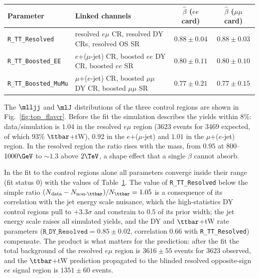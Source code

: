 \begin{table}[htbp]
  \centering
  \label{tab:top_rateparams}
  \small
  \begin{tabular}{llcc}
    \hline
    Parameter & Linked channels & $\hat\beta$ ($ee$ card) & $\hat\beta$ ($\mu\mu$ card) \\
    \hline
    \texttt{R\_TT\_Resolved} & resolved $e\mu$ CR, resolved DY CRs, resolved OS SR & $0.88 \pm 0.04$ & $0.88 \pm 0.03$ \\
    \texttt{R\_TT\_Boosted\_EE} & $e$+($\mu$-jet) CR, boosted $ee$ DY CR, boosted $ee$ SR & $0.80 \pm 0.11$ & $0.80 \pm 0.10$ \\
    \texttt{R\_TT\_Boosted\_MuMu} & $\mu$+($e$-jet) CR, boosted $\mu\mu$ DY CR, boosted $\mu\mu$ SR & $0.77 \pm 0.21$ & $0.77 \pm 0.15$ \\
    \hline
  \end{tabular}
\end{table}

The $\mlljj$ and $\mlJ$ distributions of the three control regions are shown in
Fig.~\ref{fig:top_flavcr}. Before the fit the simulation describes the yields
within $8\%$: data/simulation is $1.04$ in the resolved $e\mu$ region
($3623$ events for $3469$ expected, of which $93\%$ $\ttbar$+tW), $0.92$ in the
$e$+($\mu$-jet) and $1.01$ in the $\mu$+($e$-jet) region. In the resolved region
the ratio rises with the mass, from $0.95$ at $800$--$1000\GeV$ to ${\sim}1.3$
above $2\TeV$, a shape effect that a single $\beta$ cannot absorb.

In the fit to the control regions alone all parameters converge inside their
range (fit status 0) with the values of Table~\ref{tab:top_rateparams}. The
value of \texttt{R\_TT\_Resolved} below the simple ratio
$(N_{\text{data}} - N_{\text{non-}\ttbar})/N_{\ttbar} = 1.05$ is a consequence of
its correlation with the jet energy scale nuisance, which the high-statistics
DY control regions pull to $+3.3\sigma$ and constrain to $0.5$ of its prior
width; the jet energy scale raises all simulated yields, and the DY and
$\ttbar$+tW rate parameters ($\texttt{R\_DY\_Resolved} = 0.85 \pm 0.02$,
correlation $0.66$ with \texttt{R\_TT\_Resolved}) compensate. The product is
what matters for the prediction: after the fit the total background of the
resolved $e\mu$ region is $3616 \pm 55$ events for $3623$ observed, and the
$\ttbar$+tW prediction propagated to the blinded resolved opposite-sign $ee$
signal region is $1351 \pm 60$ events. 

